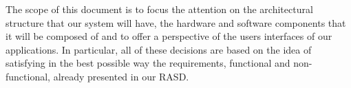 The scope of this document is to focus the attention on the architectural structure that our system will have, the hardware and software components that it will be composed of and to offer a perspective of the users interfaces of our applications. 
\newline
In particular, all of these decisions are based on the idea of satisfying in the best possible way the requirements, functional and non-functional, already presented in our RASD. 